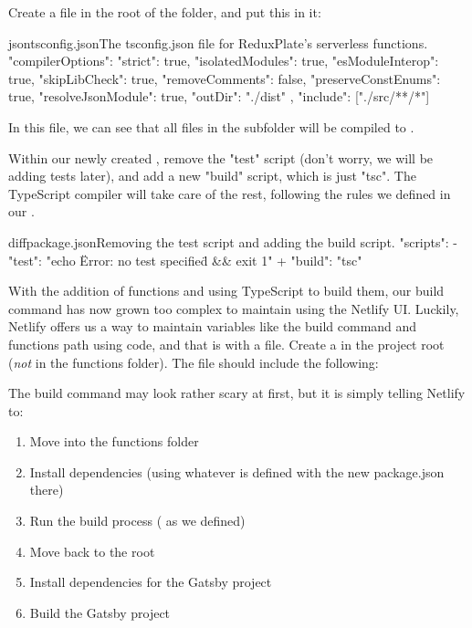 \documentclass[a4paper,headinclude=on,footinclude=on,12pt,oneside]{scrbook}
\begin{document}

Create a  file in the root of the  folder, and put this in it:

\begin{codeInput}{json}{tsconfig.json}{The tsconfig.json file for ReduxPlate's serverless functions.}
{
  "compilerOptions": {
    "strict": true,
    "isolatedModules": true,
    "esModuleInterop": true,
    "skipLibCheck": true,
    "removeComments": false,
    "preserveConstEnums": true,
    "resolveJsonModule": true,
    "outDir": "./dist"
  },
  "include": ["./src/**/*"]
}
\end{codeInput}

In this  file, we can see that all files in the subfolder  will be compiled to .


Within our newly created , remove the "test" script (don't worry, we will be adding tests later), and add a new "build" script, which is just "tsc". The TypeScript compiler will take care of the rest, following the rules we defined in our .

\begin{codeInput}{diff}{package.json}{Removing the test script and adding the build script.}
"scripts": {
-  "test": "echo \"Error: no test specified\" && exit 1"
+  "build": "tsc"
}
\end{codeInput}

With the addition of functions and using TypeScript to build them, our build command has now grown too complex to maintain using the Netlify UI. Luckily, Netlify offers us a way to maintain variables like the build command and functions path using code, and that is with a  file. Create a  in the project root (\textit{not} in the functions folder). The  file should include the following:


The build command may look rather scary at first, but it is simply telling Netlify to:

\begin{enumerate}
  \item Move into the functions folder
  \item Install dependencies (using whatever is defined with the new package.json there)
  \item Run the build process ( as we defined)
  \item Move back to the root
  \item Install dependencies for the Gatsby project
  \item Build the Gatsby project
\end{enumerate}
\end{document}

